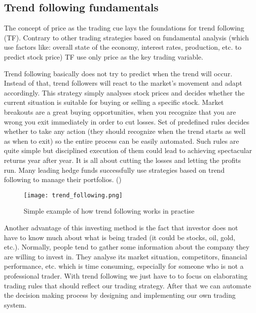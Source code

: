 \subsection{Trend following fundamentals}
\label{sec:trend_following_fundamentals}

The concept of price as the trading cue lays the foundations for trend following (TF). 
Contrary to other trading strategies based on fundamental analysis (which use factors like: overall state of the economy, interest rates, production, etc. to predict stock price)
TF use only price as the key trading variable. 

Trend following basically does not try to predict when the trend will occur. 
Instead of that, trend followers will react to the market's movement and adapt accordingly.
This strategy simply analyses stock prices and decides whether the current situation is suitable for buying or selling a specific stock.
Market breakouts are a great buying opportunities, when you recognize that you are wrong you exit immediately in order to cut losses.
Set of predefined rules decides  whether to take any action (they should recognize when the trend starts as well as when to exit) so the entire process can be easily automated.
Such rules are quite simple but disciplined execution of them could lead to achieving spectacular returns year after year.
It is all about cutting the losses and letting the profits run.
Many leading hedge funds successfully use strategies based on trend following to manage their portfolios. (\cite{Trend01})  

\begin{figure}[H]
  \begin{center}
    \texttt{[image: trend\_following.png]}
  \end{center}
  \caption{Simple example of how trend following works in practise}
\end{figure}

Another advantage of this investing method is the fact that investor does not have to know much about what is being traded (it could be stocks, oil, gold, etc.).
Normally, people tend to gather some information about the company they are willing to invest in. 
They analyse its market situation, competitors, financial performance, etc. which is time consuming, especially for someone who is not a professional trader.
With trend following we just have to to focus on elaborating trading rules that should reflect our trading strategy.
After that we can automate the decision making process by designing and implementing our own trading system.   

